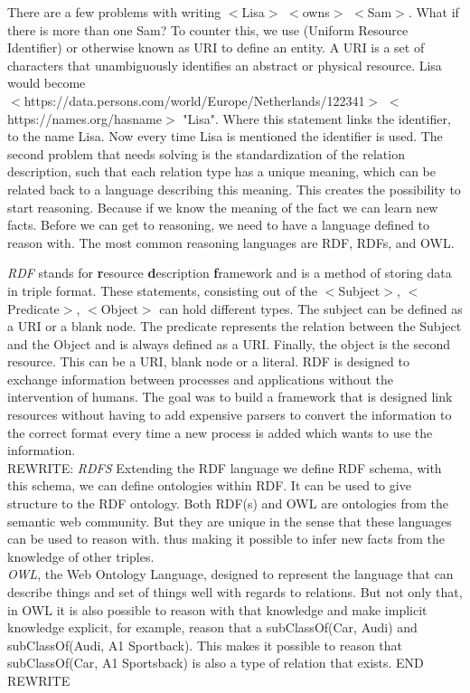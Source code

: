 \documentclass[11pt,letterpaper ,oneside ]{book}
\begin{document}
	There are a few problems with writing $<$Lisa$>$ $<$owns$>$ $<$Sam$>$. What if there is more than one Sam? To counter this, we use (Uniform Resource Identifier) or otherwise known as URI to define an entity. A URI is a set of characters that unambiguously identifies an abstract or physical resource. Lisa would become \\$<$https://data.persons.com/world/Europe/Netherlands/122341$>$ $<$https://names.org/hasname$>$ "Lisa". Where this statement links the identifier, to the name Lisa. Now every time Lisa is mentioned the identifier is used. 
	The second problem that needs solving is the standardization of the relation description, such that each relation type has a unique meaning, which can be related back to a language describing this meaning. This creates the possibility to start reasoning. Because if we know the meaning of the fact we can learn new facts. Before we can get to reasoning, we need to have a language defined to reason with. The most common reasoning languages are RDF, RDFs, and OWL.
	
	\textit{RDF} \cite{rdfPrimer:2014} stands for \textbf{r}esource \textbf{d}escription \textbf{f}ramework and is a method of storing data in triple format. These statements, consisting out of the $<$Subject$>$, $<$Predicate$>$, $<$Object$>$ can hold different types. The subject can be defined as a URI or a blank node. The predicate represents the relation between the Subject and the Object and is always defined as a URI. Finally, the object is the second resource. This can be a URI, blank node or a literal.
	RDF is designed to exchange information between processes and applications without the intervention of humans. The goal was to build a framework that is designed link resources without having to add expensive parsers to convert the information to the correct format every time a new process is added which wants to use the information.\\
	
	REWRITE:
	\textit{RDFS} \cite{RDFSchema:2014} Extending the RDF language we define RDF schema, with this schema, we can define ontologies within RDF. It can be used to give structure to the RDF ontology. Both RDF(s) and OWL are ontologies from the semantic web community. But they are unique in the sense that these languages can be used to reason with. thus making it possible to infer new facts from the knowledge of other triples.\\
	
	\textit{OWL}\cite{OWLPrimer:2012}, the Web Ontology Language, designed to represent the language that can describe things and set of things well with regards to relations. But not only that, in OWL it is also possible to reason with that knowledge and make implicit knowledge explicit, for example, reason that a subClassOf(Car, Audi) and subClassOf(Audi, A1 Sportback). This makes it possible to reason that subClassOf(Car, A1 Sportsback) is also a type of relation that exists. 
	END REWRITE
	
\end{document}
